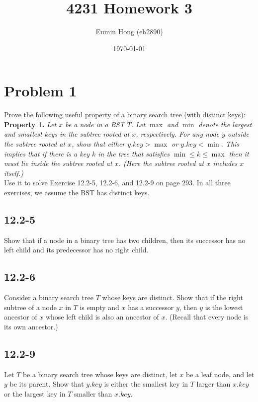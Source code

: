 \documentclass{../../class}
\title{4231 Homework 3}
\author{Eumin Hong (eh2890)}
\date{\today}
\begin{document}
\maketitle



\section*{Problem 1}
\begin{tcolorbox}
    Prove the following useful property of a binary search tree (with distinct keys): \\

    \textbf{Property 1.} \textit{Let $x$ be a node in a BST $T$. Let $\max$ and $\min$ denote the largest and smallest keys in the subtree rooted at $x$, respectively. For any node $y$ outside the subtree rooted at $x$, show that either $y.key > \max$ or $y.key < \min$. This implies that if there is a key $k$ in the tree that satisfies $\min \leq k \leq \max$ then it must lie inside the subtree rooted at $x$. (Here the subtree rooted at $x$ includes $x$ itself.)} \\

    Use it to solve Exercise 12.2-5, 12.2-6, and 12.2-9 on page 293. In all three exercises, we assume the BST has distinct keys.
\end{tcolorbox}

\subsection*{12.2-5}
Show that if a node in a binary tree has two children, then its successor has no left child and its predecessor has no right child.

\subsection*{12.2-6}
Consider a binary search tree $T$ whose keys are distinct. Show that if the right subtree of a node $x$ in $T$ is empty and $x$ has a successor $y$, then $y$ is the lowest ancestor of $x$ whose left child is also an ancestor of $x$. (Recall that every node is its own ancestor.)

\subsection*{12.2-9}
Let $T$ be a binary search tree whose keys are distinct, let $x$ be a leaf node, and let $y$ be its parent. Show that $y.key$ is either the smallest key in $T$ larger than $x.key$ or the largest key in $T$ smaller than $x.key$.
\end{document}
